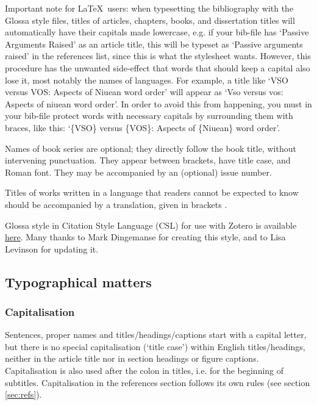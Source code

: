 \documentclass[charis,linguex]{glossa}
\begin{document}
Important note for \LaTeX\ users: when typesetting the bibliography with the Glossa style files, titles of articles, chapters, books, and dissertation titles will automatically have their capitals made lowercase, e.g. if your bib-file has `Passive Arguments Raised' as an article title, this will be typeset as `Passive arguments raised' in the references list, since this is what the stylesheet wants. However, this procedure has the unwanted side-effect that words that should keep a capital also lose it, most notably the names of languages. For example, a title like `VSO versus VOS: Aspects of Niuean word order' will appear as `Vso versus vos: Aspects of niuean word order'. In order to avoid this from happening, you must in your bib-file protect words with necessary capitals by surrounding them with braces, like this:  `\{VSO\} versus \{VOS\}: Aspects of \{Niuean\} word order'.

Names of book series are optional; they directly follow the book title, without intervening punctuation. They appear between brackets, have title case, and Roman font. They may be accompanied by an (optional) issue number.

Titles of works written in a language that readers cannot be expected to know should be accompanied by a translation, given in brackets \citep{Li1999}.

Glossa style in Citation Style Language (CSL) for use with Zotero is available \href{https://www.zotero.org/styles?q=Glossa}{here}. Many thanks to Mark Dingemanse for creating this style, and to Lisa Levinson for updating it.


\subsection{Typographical matters}

\subsubsection{Capitalisation}

Sentences, proper names and titles/headings/captions start with a capital letter, but there is no special capitalisation (`title case') within English titles/headings, neither in the article title nor in section headings or figure captions. Capitalisation is also used after the colon in titles, i.e. for the beginning of subtitles. Capitalisation in the references section follows its own rules (see section \ref{sec:refs}).

\end{document}
